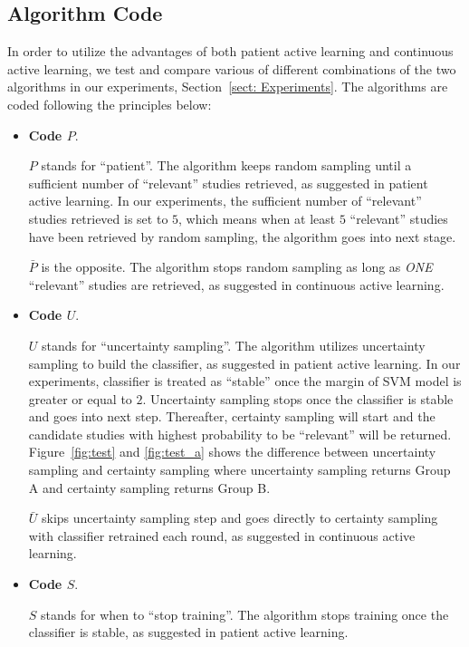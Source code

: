 \documentclass[final,twocolumn,5p]{elsarticle}
\theoremstyle{break}
\begin{document}
\subsection{Algorithm Code}
\label{sect: Algorithm Code}

In order to utilize the advantages of both patient active learning and continuous active learning, we test and compare various of different combinations of the two algorithms in our experiments, Section~\ref{sect: Experiments}. The algorithms are coded following the principles below:

\begin{itemize}

\item
{\bf Code $P$}. 

\textbf{$P$} stands for ``patient''. The algorithm keeps random sampling until a sufficient number of ``relevant'' studies retrieved, as suggested in patient active learning. In our experiments, the sufficient number of ``relevant'' studies retrieved is set to $5$, which means when at least $5$ ``relevant'' studies have been retrieved by random sampling, the algorithm goes into next stage.

\textbf{$\bar{P}$} is the opposite. The algorithm stops random sampling as long as {\em ONE} ``relevant'' studies are retrieved, as suggested in continuous active learning.

\item
{\bf Code $U$}. 

\textbf{$U$} stands for ``uncertainty sampling''. The algorithm utilizes
uncertainty sampling to build the classifier, as suggested in patient active
learning. In our experiments, classifier is treated as ``stable'' once the margin
of SVM model is greater or equal to $2$. Uncertainty sampling stops once the
classifier is stable and goes into next step. Thereafter, certainty sampling
will start and the candidate studies with highest probability to be ``relevant''
will be returned. Figure~\ref{fig:test} and \ref{fig:test_a} shows the
difference between uncertainty sampling and certainty sampling where uncertainty
sampling returns Group A and certainty sampling returns Group B.

\textbf{$\bar{U}$} skips uncertainty sampling step and goes directly to certainty sampling with classifier retrained each round, as suggested in continuous active learning.

\item
{\bf Code $S$}. 

\textbf{$S$} stands for when to ``stop training''. The algorithm stops training
once the classifier is stable, as suggested in patient active learning.


\end{itemize}
\end{document}
